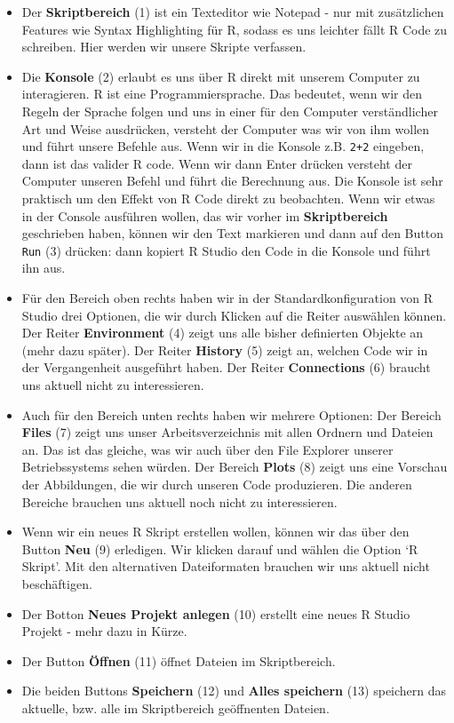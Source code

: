 \documentclass[]{tufte-book}
\begin{document}
\begin{itemize}
\item
  Der \textbf{Skriptbereich} (1) ist ein Texteditor wie Notepad - nur
  mit zusätzlichen Features wie Syntax Highlighting für R, sodass es uns
  leichter fällt R Code zu schreiben. Hier werden wir unsere Skripte
  verfassen.
\item
  Die \textbf{Konsole} (2) erlaubt es uns über R direkt mit unserem
  Computer zu interagieren. R ist eine Programmiersprache. Das bedeutet,
  wenn wir den Regeln der Sprache folgen und uns in einer für den
  Computer verständlicher Art und Weise ausdrücken, versteht der
  Computer was wir von ihm wollen und führt unsere Befehle aus. Wenn wir
  in die Konsole z.B. \texttt{2+2} eingeben, dann ist das valider R
  code. Wenn wir dann Enter drücken versteht der Computer unseren Befehl
  und führt die Berechnung aus. Die Konsole ist sehr praktisch um den
  Effekt von R Code direkt zu beobachten. Wenn wir etwas in der Console
  ausführen wollen, das wir vorher im \textbf{Skriptbereich} geschrieben
  haben, können wir den Text markieren und dann auf den Button
  \texttt{Run} (3) drücken: dann kopiert R Studio den Code in die
  Konsole und führt ihn aus.
\item
  Für den Bereich oben rechts haben wir in der Standardkonfiguration von
  R Studio drei Optionen, die wir durch Klicken auf die Reiter auswählen
  können. Der Reiter \textbf{Environment} (4) zeigt uns alle bisher
  definierten Objekte an (mehr dazu später). Der Reiter \textbf{History}
  (5) zeigt an, welchen Code wir in der Vergangenheit ausgeführt haben.
  Der Reiter \textbf{Connections} (6) braucht uns aktuell nicht zu
  interessieren.
\item
  Auch für den Bereich unten rechts haben wir mehrere Optionen: Der
  Bereich \textbf{Files} (7) zeigt uns unser Arbeitsverzeichnis mit
  allen Ordnern und Dateien an. Das ist das gleiche, was wir auch über
  den File Explorer unserer Betriebssystems sehen würden. Der Bereich
  \textbf{Plots} (8) zeigt uns eine Vorschau der Abbildungen, die wir
  durch unseren Code produzieren. Die anderen Bereiche brauchen uns
  aktuell noch nicht zu interessieren.
\item
  Wenn wir ein neues R Skript erstellen wollen, können wir das über den
  Button \textbf{Neu} (9) erledigen. Wir klicken darauf und wählen die
  Option `R Skript'. Mit den alternativen Dateiformaten brauchen wir uns
  aktuell nicht beschäftigen.
\item
  Der Botton \textbf{Neues Projekt anlegen} (10) erstellt eine neues R
  Studio Projekt - mehr dazu in Kürze.
\item
  Der Button \textbf{Öffnen} (11) öffnet Dateien im Skriptbereich.
\item
  Die beiden Buttons \textbf{Speichern} (12) und \textbf{Alles
  speichern} (13) speichern das aktuelle, bzw. alle im Skriptbereich
  geöffnenten Dateien.
\end{itemize}
\end{document}
